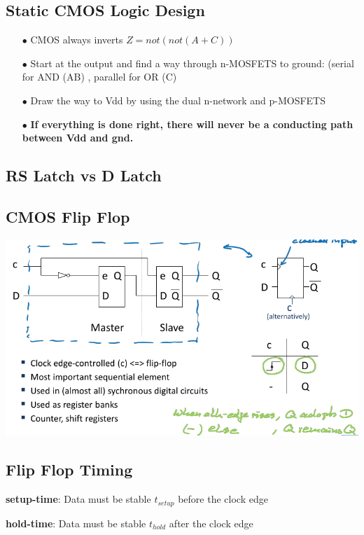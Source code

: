 \documentclass[english]{latex4ei/latex4ei_sheet}
\begin{document}
\subsection{Static CMOS Logic Design}
\begin{enumerate}
	\item[$\bullet$] CMOS always inverts $Z = not(not(A + C))$
	\item[$\bullet$] Start at the output and find a way through n-MOSFETS to ground: (serial for AND (AB) , parallel for OR (C)
	\item[$\bullet$] Draw the way to Vdd by using the dual n-network and p-MOSFETS
	\item[$\bullet$] \textbf{If everything is done right, there will
		      never be a conducting path between Vdd
		      and gnd.}
\end{enumerate}

\subsection{RS Latch vs D Latch}

\subsection{CMOS Flip Flop}

\begin{center}
  \centering
  \includegraphics[width=0.8\linewidth]{assets/CMOSFlipFlop.png}
  \label{fig:cmosflipflop}
\end{center}

\subsection{Flip Flop Timing}

\textbf{setup-time}: Data must be stable $t_{setup}$ before the clock edge

\textbf{hold-time}: Data must be stable $t_{hold}$ after the clock edge
\end{document}
